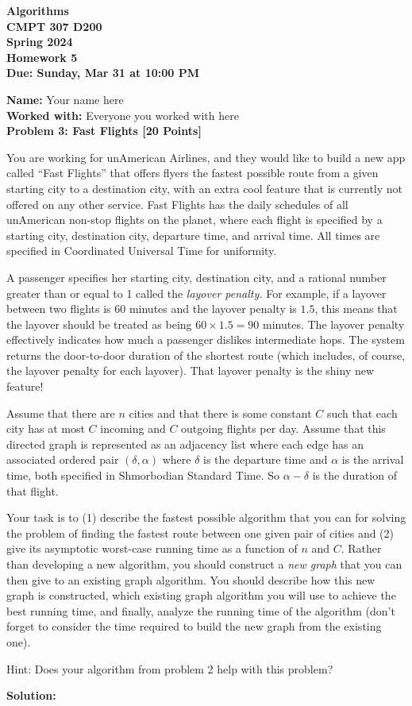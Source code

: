 \documentclass[12pt]{article}
\newcommand{\Name}[1]{\noindent \textbf{Name:} #1 \\}
\newcommand{\Workedwith}[1]{\noindent \textbf{Worked with:} #1 \\}
\newcommand{\Problem}[3]{\mbox{} \newline \noindent \textbf{\textbf{Problem #1: #2 [#3 Points] \\ }}}
\begin{document}
\begin{center}
  \bf
  Algorithms \\
  CMPT 307 D200 \\
  Spring 2024 \\
  \rm
  Homework 5\\
  Due:  Sunday, Mar 31 at 10:00 PM \\
\end{center}

\Name{Your name here}
\Workedwith{Everyone you worked with here}

\Problem{3}{Fast Flights}{20}

You are working for unAmerican Airlines, and they would like to build a new app called ``Fast Flights'' that offers flyers the fastest possible route from a given starting city to a destination city, with an extra cool feature that is currently not offered on any other service. Fast Flights has the daily schedules of all unAmerican non-stop flights on the planet, where each flight is specified by a starting city, destination city, departure time, and arrival time.  All times are specified in Coordinated Universal Time for uniformity.

A passenger specifies her starting city, destination city, and a rational number greater than or equal to 1 called the \emph{layover penalty.}  For example, if a layover between two flights is 60 minutes and the layover penalty is $1.5$, this means that the layover should be treated as being $60 \times 1.5 = 90$ minutes.  The layover penalty effectively indicates how much a passenger dislikes intermediate hops.  The system returns the door-to-door duration of the shortest route (which includes, of course, the layover penalty for each layover).  That layover penalty is the shiny new feature!

Assume that there are $n$ cities and that there is some constant $C$ such that each city has at most $C$ incoming and $C$ outgoing flights per day.  Assume that this directed graph is represented as an adjacency list where each edge has an associated ordered pair $(\delta, \alpha)$ where $\delta$ is the departure time and $\alpha$ is the arrival time, both specified in Shmorbodian Standard Time.  So $\alpha - \delta$ is the duration of that flight.

Your task is to (1) describe the fastest possible algorithm that you can for solving the problem of finding the fastest route between one given pair of cities and (2) give its asymptotic worst-case running time as a function of $n$ and $C$.  Rather than developing a new algorithm, you should construct a \emph{new graph} that you can then give to an existing graph algorithm.
You should describe how this new graph is constructed, which existing graph algorithm you will use to achieve the best running time, and finally, analyze the running time of the algorithm (don't forget to consider the time required to build the new graph from the existing one).

Hint: Does your algorithm from problem 2 help with this problem?

\textbf{Solution:}
\end{document}
